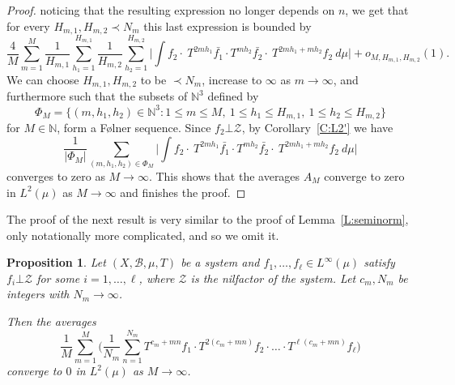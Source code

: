 \documentclass[11pt]{amsart}
\newcommand{\cZ}{\mathcal{Z}}
\newcommand{\N}{\mathbb{N}}
\theoremstyle{plain}
\newtheorem{proposition}[theorem]{Proposition}
\theoremstyle{definition}
\theoremstyle{remark}
\newtheorem*{remark}{Remark}
\begin{document}
\begin{proof}
noticing that the resulting expression no longer depends on $n$, we
get that for every $H_{m,1},H_{m,2}\prec N_m$ this last expression is
bounded by
$$
\frac{4}{M}\sum_{m=1}^{M}\frac{1}{H_{m,1}}\sum_{h_1=1}^{H_{m,1}}
\frac{1}{H_{m,2}}\sum_{h_2=1}^{H_{m,2}}\Big|\int f_2 \cdot\
T^{2mh_1}\bar{f_1}\cdot T^{mh_2}\bar{f_2} \cdot\ T^{2mh_1+mh_2}f_2\
d\mu\Big| +o_{M,H_{m,1}, H_{m,2}}{(1)}.
$$
We can  choose $H_{m,1}, H_{m,2}$ to be $\prec N_m$, increase to $\infty$
as $m\to\infty$, and furthermore such that the subsets of
$\mathbb{N}^3$ defined by
$$
\Phi_{M}=\{ (m,h_1,h_2)\in \mathbb{N}^3\colon 1\leq m\leq M,\ 1\leq
h_1\leq H_{m,1},\ 1\leq h_2\leq H_{m,2}\}
$$
for $M\in\N$, form a F{\o}lner sequence.
Since $f_2\bot \mathcal{Z}$, by
Corollary~\ref{C:L2'}  we have
$$
\frac{1}{|\Phi_M|}\sum_{(m,h_1,h_2)\in \Phi_M}\Big|\int f_2 \cdot\
T^{2mh_1}\bar{f_1}\cdot T^{mh_2}\bar{f_2} \cdot\ T^{2mh_1+mh_2}f_2\
d\mu\Big|
$$
converges to zero as $M\to\infty$. This shows that the averages  $A_M$ converge to
zero in $L^2(\mu)$ as $M\to \infty$ and finishes the proof.
\end{proof}
The proof of the next result is very similar to the proof of
Lemma~\ref{L:seminorm}, only notationally more complicated, and so we
omit it.
\begin{proposition}\label{P:seminorm'} Let $(X,\mathcal{B},\mu,T)$ be
  a system and  $f_1,\ldots, f_{\ell} \in L^\infty(\mu)$ satisfy
  $f_i\bot \mathcal{Z}$ for some $i=1,\ldots,\ell$, where $\cZ$ is the nilfactor of the system. Let $c_m,N_m$ be integers with $N_m\to  \infty$.

   Then the averages
$$
\frac{1}{M}\sum_{m=1}^M\Big(\frac{1}{N_m}\sum_{n=1}^{N_m}
T^{c_m+mn}f_1 \cdot T^{2(c_m+mn)}f_2\cdot\ldots\cdot T^{\ell
  (c_m+mn)}f_\ell \Big)
$$
converge to $0$ in $L^2(\mu)$ as $M\to \infty$.
\end{proposition}
\end{document}
